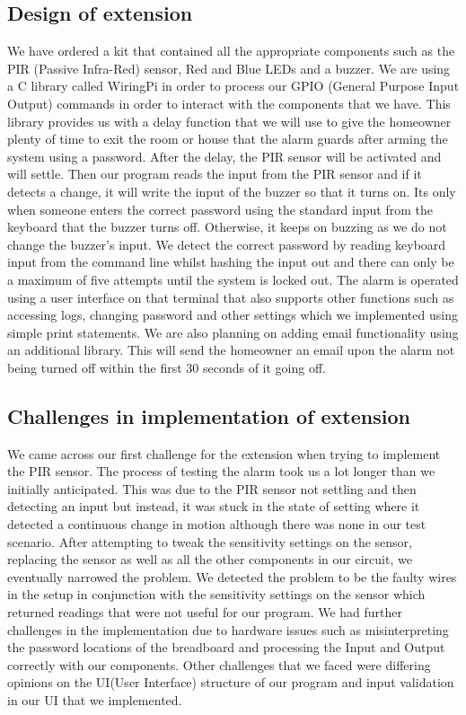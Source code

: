 \documentclass[11pt]{article}
\begin{document}
\subsection{Design of extension}
We have ordered a kit that contained all the appropriate components such as the PIR (Passive Infra-Red) sensor, Red and Blue LEDs and a buzzer. We are using a C library called WiringPi in order to process our GPIO (General Purpose Input Output) commands in order to interact with the components that we have.  This library provides us with a delay function that we will use to give the homeowner plenty of time to exit the room or house that the alarm guards after arming the system using a password. After the delay, the PIR sensor will be activated and will settle. Then our program reads the input from the PIR sensor and if it detects a change, it will write the input of the buzzer so that it turns on. Its only when someone enters the correct password using the standard input from the keyboard that the buzzer turns off. Otherwise, it keeps on buzzing as we do not change the buzzer's input. We detect the correct password by reading keyboard input from the command line whilst hashing the input out and there can only be a maximum of five attempts until the system is locked out. The alarm is operated using a user interface on that terminal that also supports other functions such as accessing logs, changing password and other settings which we implemented using simple print statements. We are also planning on adding email functionality using an additional library. This will send the homeowner an email upon the alarm not being turned off within the first 30 seconds of it going off. 

\subsection{Challenges in implementation of extension}
We came across our first challenge for the extension when trying to implement the PIR sensor. The process of testing the alarm took us a lot longer than we initially anticipated. This was due to the PIR sensor not settling and then detecting an input but instead, it was stuck in the state of setting where it detected a continuous change in motion although there was none in our test scenario. After attempting to tweak the sensitivity settings on the sensor, replacing the sensor as well as all the other components in our circuit, we eventually narrowed the problem. We detected the problem to be the faulty wires in the setup in conjunction with the sensitivity settings on the sensor which returned readings that were not useful for our program. We had further challenges in the implementation due to hardware issues such as misinterpreting the password locations of the breadboard and processing the Input and Output correctly with our components. Other challenges that we faced were differing opinions on the UI(User Interface) structure of our program and input validation in our UI that we implemented. 
\end{document}
